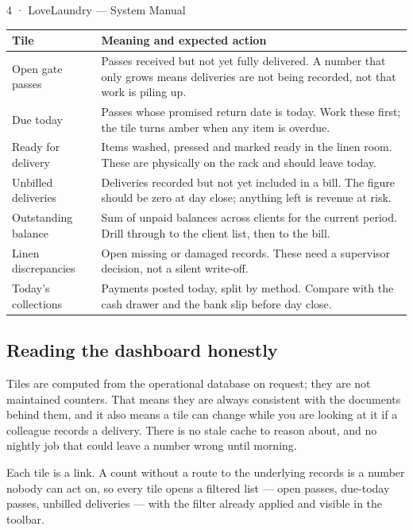 \documentclass[11pt,a4paper,oneside]{book}
\begin{document}
4 · LoveLaundry — System Manual

\begin{center}\small
\begin{tabularx}{\linewidth}{|X|X|}
\hline
\rowcolor{lightgrey}
\textbf{Tile} & \textbf{Meaning and expected action} \\ \hline
Open gate passes & Passes received but not yet fully delivered. A number that only grows means deliveries are not being recorded, not that work is piling up. \\ \hline
Due today & Passes whose promised return date is today. Work these first; the tile turns amber when any item is overdue. \\ \hline
Ready for delivery & Items washed, pressed and marked ready in the linen room. These are physically on the rack and should leave today. \\ \hline
Unbilled deliveries & Deliveries recorded but not yet included in a bill. The figure should be zero at day close; anything left is revenue at risk. \\ \hline
Outstanding balance & Sum of unpaid balances across clients for the current period. Drill through to the client list, then to the bill. \\ \hline
Linen discrepancies & Open missing or damaged records. These need a supervisor decision, not a silent write-off. \\ \hline
Today's collections & Payments posted today, split by method. Compare with the cash drawer and the bank slip before day close. \\ \hline
\end{tabularx}
\end{center}
\subsection*{Reading the dashboard honestly}
Tiles are computed from the operational database on request; they are not maintained counters. That means they are always consistent with the documents behind them, and it also means a tile can change while you are looking at it if a colleague records a delivery. There is no stale cache to reason about, and no nightly job that could leave a number wrong until morning.

Each tile is a link. A count without a route to the underlying records is a number nobody can act on, so every tile opens a filtered list — open passes, due-today passes, unbilled deliveries — with the filter already applied and visible in the toolbar.
\end{document}
